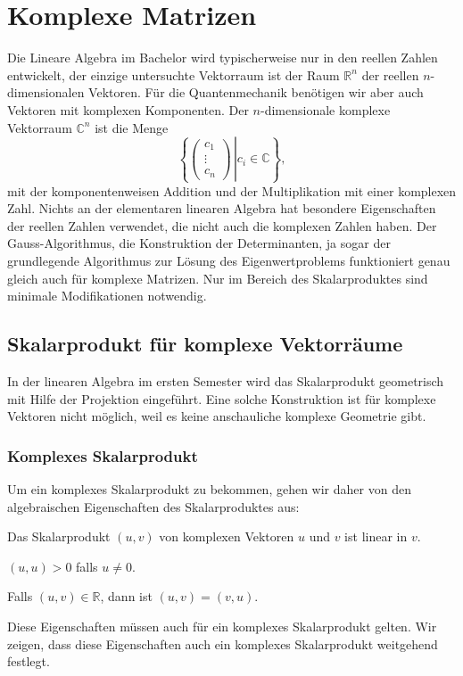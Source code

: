 \section{Komplexe Matrizen}
%
Die Lineare Algebra im Bachelor wird typischerweise nur in den
reellen Zahlen entwickelt, der einzige untersuchte Vektorraum ist
der Raum $\mathbb R^n$ der reellen $n$-dimensionalen Vektoren.
Für die Quantenmechanik benötigen wir aber auch Vektoren mit
komplexen Komponenten. Der $n$-dimensionale komplexe Vektorraum
$\mathbb C^n$ ist die Menge
\[
\left\{\left.\begin{pmatrix}c_1\\\vdots\\c_n\end{pmatrix}\,\right|
c_i\in\mathbb C\right\},
\]
mit der komponentenweisen Addition und der Multiplikation mit einer
komplexen Zahl. Nichts an der elementaren linearen Algebra hat besondere
Eigenschaften der reellen Zahlen verwendet, die nicht auch die komplexen
Zahlen haben. Der Gauss-Algorithmus, die Konstruktion der Determinanten,
ja sogar der grundlegende Algorithmus zur Lösung des Eigenwertproblems
funktioniert genau gleich auch für komplexe Matrizen. Nur im Bereich
des Skalarproduktes sind minimale Modifikationen notwendig.

\subsection{Skalarprodukt für komplexe Vektorräume}
In der linearen Algebra im ersten Semester wird das Skalarprodukt
geometrisch mit Hilfe der Projektion eingeführt.
Eine solche Konstruktion ist für komplexe Vektoren nicht möglich,
weil es keine anschauliche komplexe Geometrie gibt.

\subsubsection{Komplexes Skalarprodukt}
Um ein komplexes Skalarprodukt zu bekommen, gehen wir daher von den
algebraischen Eigenschaften des Skalarproduktes aus:
\begin{compactenum}
\item Das Skalarprodukt $(u,v)$ von komplexen Vektoren $u$ und $v$ ist linear
in $v$.
\item $(u,u) > 0$ falls $u\ne 0$.
\item Falls $(u,v)\in\mathbb R$, dann ist $(u,v)=(v,u)$.
\end{compactenum}
Diese Eigenschaften müssen auch für ein komplexes Skalarprodukt gelten.
Wir zeigen, dass diese Eigenschaften auch ein komplexes Skalarprodukt 
weitgehend festlegt.

